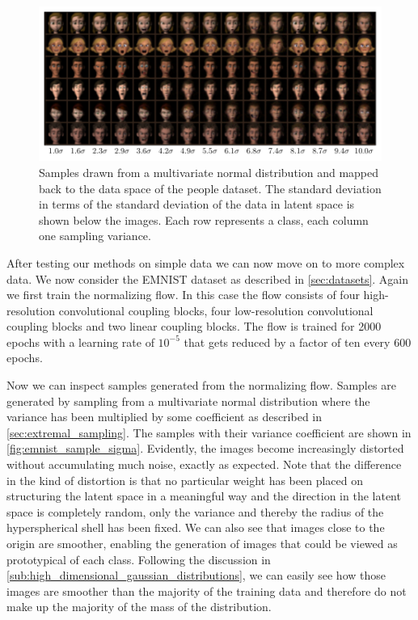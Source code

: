 \begin{figure}[htpb]
	\centering
        \includegraphics{figures/samples/samples_increasing_distance_FERG_people.pdf}
	\caption{Samples drawn from a multivariate normal distribution and
		mapped back to the data space of the people dataset. The standard
		deviation in terms of the standard deviation of the data in latent
		space is shown below the images. Each row represents a class, each
		column one sampling variance.}%
	\label{fig:ferg_sample_sigma}
\end{figure}

After testing our methods on simple data we can now move on to more complex
data. We now consider the EMNIST dataset as described in
\autoref{sec:datasets}. Again we first train the normalizing flow. In this case
the flow consists of four high-resolution convolutional coupling blocks, four
low-resolution convolutional coupling blocks and two linear coupling blocks.
The flow is trained for 2000 epochs with a learning rate of $10^{-5}$ that gets
reduced by a factor of ten every 600 epochs.

Now we can inspect samples generated from the normalizing flow. Samples are
generated by sampling from a multivariate normal distribution where the
variance has been multiplied by some coefficient as described in
\autoref{sec:extremal_sampling}. The samples with their variance coefficient
are shown in \autoref{fig:emnist_sample_sigma}. Evidently, the images
become increasingly distorted without accumulating much noise, exactly as
expected. Note that the difference in the kind of distortion is that no
particular weight has been placed on structuring the latent space in a
meaningful way and the direction in the latent space is completely random, only
the variance and thereby the radius of the hyperspherical shell has been fixed.
We can also see that images close to the origin are smoother, enabling the
generation of images that could be viewed as prototypical of each class.
Following the discussion in
\autoref{sub:high_dimensional_gaussian_distributions}, we can
easily see how those images are smoother than the majority of the training data
and therefore do not make up the majority of the mass of the distribution.

